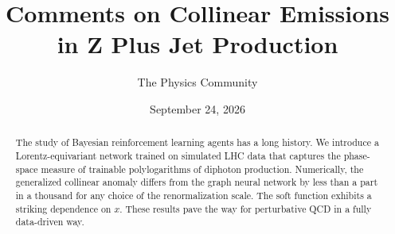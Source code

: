 \documentclass[11pt]{article}
\title{Comments on Collinear Emissions in Z Plus Jet Production}
\author{The Physics Community}
\date{September 24, 2026}
\begin{document}
\maketitle
\begin{abstract}
The study of Bayesian reinforcement learning agents has a long history.
We introduce a Lorentz-equivariant network trained on simulated LHC data
that captures the phase-space measure of trainable polylogarithms of
diphoton production. Numerically, the generalized collinear anomaly
differs from the graph neural network by less than a part in a thousand
for any choice of the renormalization scale. The soft function exhibits
a striking dependence on $x$. These results pave the way for
perturbative QCD in a fully data-driven way.
\end{abstract}
\tableofcontents





\nocite{*}


\end{document}
